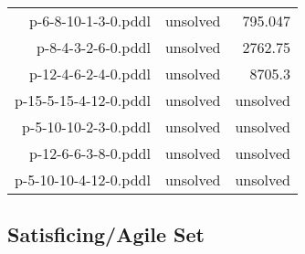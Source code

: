 \documentclass{article}
\begin{document}
\begin{center}
\begin{tabular}{r|r|r}
 p-6-8-10-1-3-0.pddl&unsolved&795.047\\
 p-8-4-3-2-6-0.pddl&unsolved&2762.75\\
 p-12-4-6-2-4-0.pddl&unsolved&8705.3\\
 p-15-5-15-4-12-0.pddl&unsolved&unsolved\\
 p-5-10-10-2-3-0.pddl&unsolved&unsolved\\
 p-12-6-6-3-8-0.pddl&unsolved&unsolved\\
 p-5-10-10-4-12-0.pddl&unsolved&unsolved
                            \end{tabular}
                            \end{center}
                    

                    \subsection*{Satisficing/Agile Set}
                    
\end{document}
